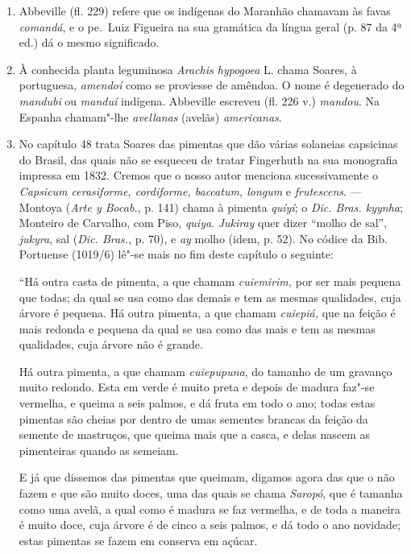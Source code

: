 \begin{enumerate}
\item Abbeville (fl. 229) refere que os indígenas do Maranhão chamavam às favas \textit{comandá}, 
e o pe.~Luiz Figueira na sua gramática da língua geral (p. 87 da 4ª ed.) dá o 
mesmo significado.

\item À conhecida planta leguminosa \textit{Arachis hypogoea} L. chama Soares, à portuguesa,  
\textit{amendoí} como se proviesse de amêndoa. O nome é degenerado do \textit{mandubi} ou \textit{manduí}
indígena. Abbeville escreveu (fl. 226 v.) \textit{mandou}. Na  Espanha  chamam"-lhe  
\textit{avellanas} (avelãs) \textit{americanas}.

\item No capítulo 48 trata Soares das pimentas que dão várias solaneias capsicinas do 
Brasil, das quais não se esqueceu de tratar Fingerhuth na sua monografia impressa em 
1832. Cremos que o nosso autor menciona sucessivamente o \textit{Capsicum cerasiforme, 
cordiforme, baccatum, longum} e \textit{frutescens}. --- Montoya (\textit{Arte y Bocab.}, p. 141) chama à 
pimenta \textit{quíyí}; o \textit{Dic. Bras. kyynha}; Monteiro de Carvalho, com Piso, \textit{quiya}.
\textit{Jukiray} quer dizer ``molho de sal'',  \textit{jukyra}, sal (\textit{Dic. Bras.}, p. 70), e \textit{ay} molho (idem, p. 52).
No códice da Bib. Portuense (1019/6) lê"-se mais no fim deste capítulo o seguinte:

``Há outra casta de pimenta, a que chamam \textit{cuiemirim,} por ser mais pequena que todas; 
da qual se usa como das demais e tem as mesmas qualidades, cuja árvore é pequena.
Há outra pimenta, a que chamam \textit{cuiepiá,} que na feição é mais redonda e pequena da qual se 
usa como das mais e tem as mesmas qualidades, cuja árvore não é grande.

Há outra pimenta, a que chamam \textit{cuiepupuna}, do tamanho de um gravanço muito redondo. 
Esta em verde é muito preta e depois de madura faz"-se vermelha, e queima a seis 
palmos, e dá fruta em todo o ano; todas estas pimentas são cheias por dentro de umas 
sementes brancas da feição da semente de mastruços, que queima mais que a casca, e delas 
nascem as pimenteiras quando as semeiam. 

E já que dissemos das pimentas que queimam, digamos agora das que o não fazem e 
que são muito doces, uma das quais se chama \textit{Saropó}, que é tamanha como uma avelã, a 
qual como é madura se faz vermelha, e de toda a maneira é muito doce, cuja árvore é de 
cinco a seis palmos, e dá todo o ano novidade; estas pimentas se fazem em conserva em 
açúcar. 


\end{enumerate}
